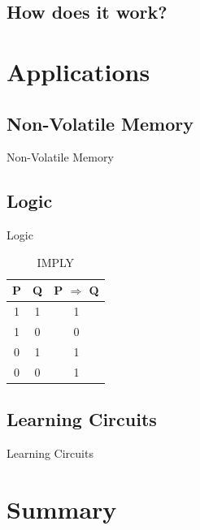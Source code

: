 \documentclass{beamer}
\begin{document}
\subsection{How does it work?}

\begin{frame}
\end{frame}

\begin{frame}
\end{frame}

\section{Applications}

\subsection{Non-Volatile Memory}
\begin{frame}{Non-Volatile Memory}

\end{frame}
\subsection{Logic}
\begin{frame}{Logic}
\begin{table}[h]
\centering
\caption{IMPLY}
\begin{tabular}{cc|c}
P & Q & P $\Rightarrow$ Q \\
\hline
1 & 1 & 1 \\
1 & 0 & 0 \\
0 & 1 & 1 \\
0 & 0 & 1
\end{tabular}
\end{table}
\end{frame}
\subsection{Learning Circuits}
\begin{frame}{Learning Circuits}

\end{frame}

\section*{Summary}
\end{document}
